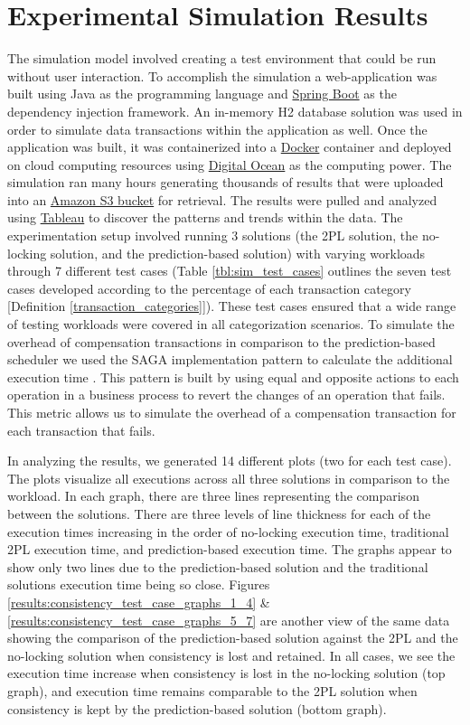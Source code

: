 \section{Experimental Simulation Results}
\label{pbs:experimentation}
The simulation model involved creating a test environment that could be run without user interaction. To accomplish the simulation a web-application was built using Java as the programming language and \href{https://spring.io/projects/spring-boot}{Spring Boot} as the dependency injection framework. An in-memory H2 database solution was used in order to simulate data transactions within the application as well. Once the application was built, it was containerized into a \href{https://www.docker.com/}{Docker} container and deployed on cloud computing resources using \href{https://www.digitalocean.com/}{Digital Ocean} as the computing power. The simulation ran many hours generating thousands of results that were uploaded into an \href{https://aws.amazon.com/s3/}{Amazon S3 bucket} for retrieval. The results were pulled and analyzed using \href{https://www.tableau.com/}{Tableau} to discover the patterns and trends within the data. The experimentation setup involved running 3 solutions (the 2PL solution, the no-locking solution, and the prediction-based solution) with varying workloads through 7 different test cases (Table \ref{tbl:sim_test_cases} outlines the seven test cases developed according to the percentage of each transaction category [Definition \ref{transaction_categories}]). These test cases ensured that a wide range of testing workloads were covered in all categorization scenarios. To simulate the overhead of compensation transactions in comparison to the prediction-based scheduler we used the SAGA implementation pattern to calculate the additional execution time \cite{SAGAS-Garcaa-Molrna}. This pattern is built by using equal and opposite actions to each operation in a business process to revert the changes of an operation that fails. This metric allows us to simulate the overhead of a compensation transaction for each transaction that fails.

In analyzing the results, we generated 14 different plots (two for each test case). The plots visualize all executions across all three solutions in comparison to the workload. In each graph, there are three lines representing the comparison between the solutions. There are three levels of line thickness for each of the execution times increasing in the order of no-locking execution time, traditional 2PL execution time, and prediction-based execution time. The graphs appear to show only two lines due to the prediction-based solution and the traditional solutions execution time being so close. Figures \ref{results:consistency_test_case_graphs_1_4} \& \ref{results:consistency_test_case_graphs_5_7} are another view of the same data showing the comparison of the prediction-based solution against the 2PL and the no-locking solution when consistency is lost and retained. In all cases, we see the execution time increase when consistency is lost in the no-locking solution (top graph), and execution time remains comparable to the 2PL solution when consistency is kept by the prediction-based solution (bottom graph).

